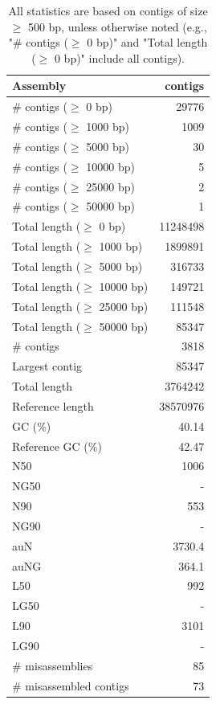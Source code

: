 \documentclass[12pt,a4paper]{article}
\begin{document}
\begin{table}[ht]
\begin{center}
\caption{All statistics are based on contigs of size $\geq$ 500 bp, unless otherwise noted (e.g., "\# contigs ($\geq$ 0 bp)" and "Total length ($\geq$ 0 bp)" include all contigs).}
\begin{tabular}{|l*{1}{|r}|}
\hline
Assembly & contigs \\ \hline
\# contigs ($\geq$ 0 bp) & 29776 \\ \hline
\# contigs ($\geq$ 1000 bp) & 1009 \\ \hline
\# contigs ($\geq$ 5000 bp) & 30 \\ \hline
\# contigs ($\geq$ 10000 bp) & 5 \\ \hline
\# contigs ($\geq$ 25000 bp) & 2 \\ \hline
\# contigs ($\geq$ 50000 bp) & 1 \\ \hline
Total length ($\geq$ 0 bp) & 11248498 \\ \hline
Total length ($\geq$ 1000 bp) & 1899891 \\ \hline
Total length ($\geq$ 5000 bp) & 316733 \\ \hline
Total length ($\geq$ 10000 bp) & 149721 \\ \hline
Total length ($\geq$ 25000 bp) & 111548 \\ \hline
Total length ($\geq$ 50000 bp) & 85347 \\ \hline
\# contigs & 3818 \\ \hline
Largest contig & 85347 \\ \hline
Total length & 3764242 \\ \hline
Reference length & 38570976 \\ \hline
GC (\%) & 40.14 \\ \hline
Reference GC (\%) & 42.47 \\ \hline
N50 & 1006 \\ \hline
NG50 & - \\ \hline
N90 & 553 \\ \hline
NG90 & - \\ \hline
auN & 3730.4 \\ \hline
auNG & 364.1 \\ \hline
L50 & 992 \\ \hline
LG50 & - \\ \hline
L90 & 3101 \\ \hline
LG90 & - \\ \hline
\# misassemblies & 85 \\ \hline
\# misassembled contigs & 73 \\ \hline

\end{tabular}
\end{center}
\end{table}
\end{document}
